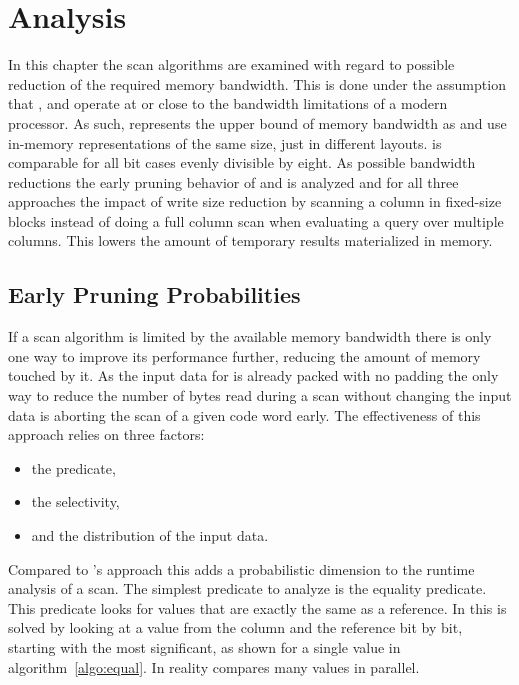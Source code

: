 \chapter{Analysis}
\label{chapter:analysis}

In this chapter the scan algorithms are examined with regard to possible
reduction of the required memory bandwidth. This is done under the assumption
that \simdscan{}, \bwv{} and \bs{} operate at or close to the bandwidth
limitations of a modern processor. As such, \simdscan{} represents the upper
bound of memory bandwidth as \simdscan{} and \bwv{} use in-memory representations
of the same size, just in different layouts. \bs{} is comparable for all bit
cases evenly divisible by eight. As possible bandwidth reductions the early
pruning behavior of \bwv{} and \bs{} is analyzed and for all three approaches
the impact of write size reduction by scanning a column in fixed-size blocks
instead of doing a full column scan when evaluating a query over multiple
columns. This lowers the amount of temporary results materialized in memory.

\section{Early Pruning Probabilities}

If a scan algorithm is limited by the available memory bandwidth there is only
one way to improve its performance further, reducing the amount of memory
touched by it. As the input data for \bwv{} is already packed with no padding
the only way to reduce the number of bytes read during a scan without changing
the input data is aborting the scan of a given code word early. The
effectiveness of this approach relies on three factors:

\begin{itemize}
  \item the predicate,
  \item the selectivity,
  \item and the distribution of the input data.
\end{itemize}

Compared to \simdscan{}'s approach this adds a probabilistic dimension to the
runtime analysis of a scan. The simplest predicate to analyze is the equality
predicate. This predicate looks for values that are exactly the same as a
reference. In \bwv{} this is solved by looking at a value from the column and
the reference bit by bit, starting with the most significant, as shown for a
single value in algorithm~\ref{algo:equal}. In reality \bwv{} compares many
values in parallel.

